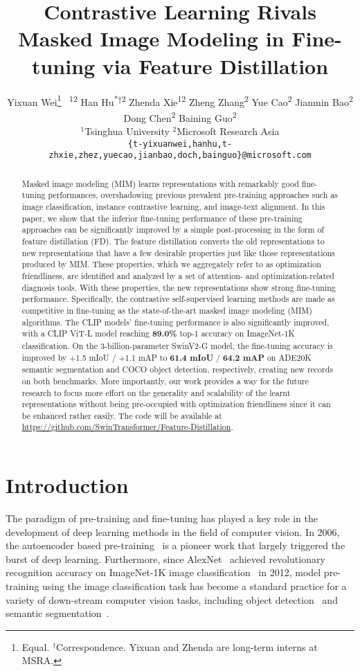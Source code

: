 \documentclass{article}
\title{Contrastive Learning Rivals Masked Image Modeling in Fine-tuning via Feature Distillation}
\author{Yixuan Wei\thanks{Equal. $^\dag$Correspondence. Yixuan and Zhenda are long-term interns at MSRA.}\textsuperscript{~~12} \quad Han Hu\textsuperscript{*$\dag$2} \quad Zhenda Xie\textsuperscript{12} \quad Zheng Zhang\textsuperscript{2} \NewAnd Yue Cao\textsuperscript{2} \quad Jianmin Bao\textsuperscript{2} \quad Dong Chen\textsuperscript{2} \quad Baining Guo\textsuperscript{2} \\
  $^1$Tsinghua University \quad 
  $^2$Microsoft Research Asia\\
  \texttt{\{t-yixuanwei,hanhu,t-zhxie,zhez,yuecao,jianbao,doch,bainguo\}@microsoft.com} \\
}
\begin{document}
\maketitle

\begin{abstract}

Masked image modeling (MIM) learns representations with remarkably good fine-tuning performances, overshadowing previous prevalent pre-training approaches such as image classification, instance contrastive learning, and image-text alignment. In this paper, we show that the inferior fine-tuning performance of these pre-training approaches can be significantly improved by a simple post-processing in the form of feature distillation (FD). The feature distillation converts the old representations to new representations that have a few desirable properties just like those representations produced by MIM. These properties, which we aggregately refer to as optimization friendliness, are identified and analyzed by a set of attention- and optimization-related diagnosis tools. With these properties, the new representations show strong fine-tuning performance. Specifically, the contrastive self-supervised learning methods are made as competitive in fine-tuning as the state-of-the-art masked image modeling (MIM) algorithms. The CLIP models' fine-tuning performance is also significantly improved, with a CLIP ViT-L model reaching \textbf{89.0\%} top-1 accuracy on ImageNet-1K classification. On the 3-billion-parameter SwinV2-G model, the fine-tuning accuracy is improved by +1.5 mIoU / +1.1 mAP to \textbf{61.4 mIoU} / \textbf{64.2 mAP} on ADE20K semantic segmentation and COCO object detection, respectively, creating new records on both benchmarks. More importantly, our work provides a way for the future research to focus more effort on the generality and scalability of the learnt representations without being pre-occupied with optimization friendliness since it can be enhanced rather easily. The code will be available at \url{https://github.com/SwinTransformer/Feature-Distillation}.

\end{abstract}


\section{Introduction}

The paradigm of pre-training and fine-tuning has played a key role in the development of deep learning methods in the field of computer vision. In 2006, the autoencoder based pre-training~\cite{HinSal06} is a pioneer work that largely triggered the burst of deep learning. Furthermore, since AlexNet~\cite{alexnet} achieved revolutionary recognition accuracy on ImageNet-1K image classification~\cite{deng2009imagenet} in 2012, model pre-training using the image classification task has become a standard practice for a variety of down-stream computer vision tasks, including object detection~\cite{rcnn13} and semantic segmentation~\cite{long2015fully}.
\end{document}
